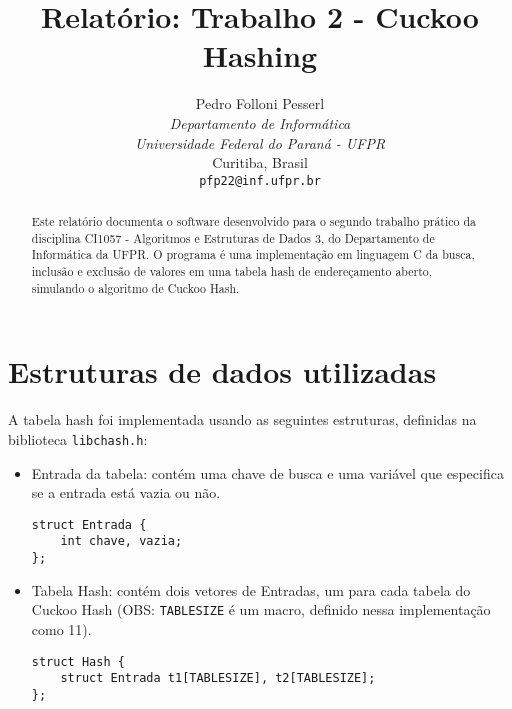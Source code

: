 \documentclass[a4paper, 11pt]{article}
\title{Relatório: Trabalho 2 - Cuckoo Hashing}
\author{Pedro Folloni Pesserl\\
\textit{Departamento de Informática}\\
\textit{Universidade Federal do Paraná - UFPR}\\
Curitiba, Brasil\\
\texttt{pfp22@inf.ufpr.br}}
\date{}
\begin{document}
\maketitle

\begin{abstract}
\begin{singlespace}
Este relatório documenta o software desenvolvido para o segundo trabalho prático da
disciplina CI1057 - Algoritmos e Estruturas de Dados 3, do Departamento de Informática
da UFPR. O programa é uma implementação em linguagem C da busca, inclusão e exclusão
de valores em uma tabela hash de endereçamento aberto, simulando o algoritmo de
Cuckoo Hash.
\end{singlespace}
\end{abstract}

\section{Estruturas de dados utilizadas}
A tabela hash foi implementada usando as seguintes estruturas, definidas na biblioteca
\texttt{libchash.h}:
\begin{itemize}
    \item Entrada da tabela: contém uma chave de busca e uma variável que especifica se
        a entrada está vazia ou não.
    \begin{verbatim}
struct Entrada {
    int chave, vazia;
};
    \end{verbatim}

    \item Tabela Hash: contém dois vetores de Entradas, um para cada tabela do Cuckoo
        Hash (OBS: \texttt{TABLESIZE} é um macro, definido nessa implementação como 11).
    \begin{verbatim}
struct Hash {
    struct Entrada t1[TABLESIZE], t2[TABLESIZE];
};
    \end{verbatim}
\end{itemize}
\end{document}
